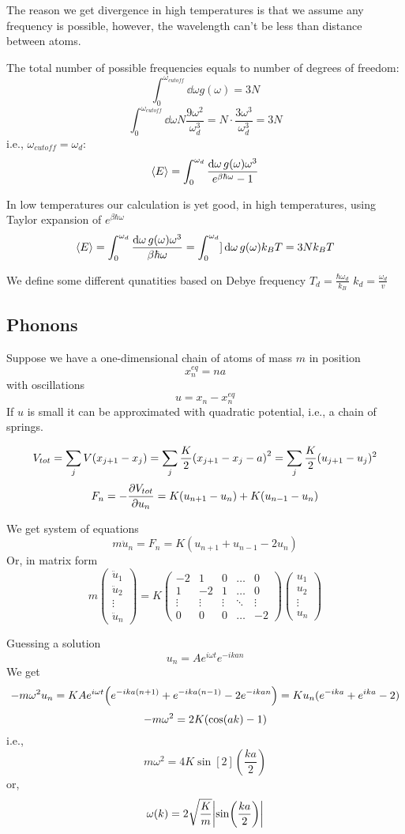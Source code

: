 The reason we get divergence in high temperatures is that we assume any frequency is possible, however, the wavelength can't be less than distance between atoms.

The total number of possible frequencies equals to number of degrees of freedom:
$$\int_0^{\omega_{cutoff}} \dd{\omega} g(\omega) = 3N$$
$$\int_0^{\omega_{cutoff}} \dd{\omega}N \frac{9\omega^2}{\omega_d^3} = N\cdot \frac{3\omega^3}{\omega_d^3}=3N$$
i.e., $\omega_{cutoff} = \omega_d$:
$$\expval{E} = \int_0^{\omega_d} \frac{\dd{\omega} g(\omega) \omega^3}{e^{\beta \hbar \omega}-1}$$

In low temperatures our calculation is yet good, in high temperatures, using Taylor expansion of $e^{\beta \hbar \omega}$
$$\expval{E} = \int_0^{\omega_d} \frac{\dd{\omega} g(\omega) \omega^3}{\beta \hbar \omega} = \int_0^{\omega_d} ]\dd{\omega} g(\omega) k_B T = 3Nk_B T$$

We define some different qunatities based on Debye frequency
$T_d = \frac{\hbar \omega_d}{k_B}$
$k_d = \frac{ \omega_d}{v}$

\subsection{Phonons}
Suppose we have a one-dimensional chain of atoms of mass $m$ in position
$$x_n^{eq} = na$$
with  oscillations
$$u =x_n - x_n^{eq}$$
If $u$ is small it can be approximated with quadratic potential, i.e., a chain of springs.

$$V_{tot} = \sum_j V(x_{j+1}-x_j) = \sum_j \frac{K}{2} \qty(x_{j+1} -x_j -a)^2 = \sum_j \frac{K}{2} (u_{j+1}-u_j)^2 $$
$$F_n = -\pdv{V_{tot}}{u_n} = K(u_{n+1}-u_n) + K(u_{n-1}-u_n)$$

We get system of equations
$$m\ddot{u}_n = F_n = K(u_{n+1} + u_{n-1} - 2u_n)$$
Or, in matrix form
$$m\begin{pmatrix}
\ddot{u}_1\\\ddot{u}_2\\\vdots \\\ddot{u}_n
\end{pmatrix} = K\begin{pmatrix}
-2&1&0&\dots&0\\
1&-2&1&\dots& 0\\
\vdots&\vdots&\vdots&\ddots&\vdots\\
0&0&0&\dots &-2
\end{pmatrix}\begin{pmatrix}
u_1\\u_2\\\vdots \\u_n
\end{pmatrix} $$

Guessing a solution
$$u_n = A e^{i\omega t} e^{-ikan}$$
We get
$$-m\omega^2u_n = K A  e^{i\omega t}\qty( e^{-ika(n+1)}+e^{-ika(n-1)} - 2e^{-ikan} ) = Ku_n(e^{-ika} + e^{ika} -2)$$
$$-m\omega^2 = 2K\qty(\cos(ak)-1)$$
i.e.,
$$m\omega^2 = 4K \sin[2](\frac{ka}{2})$$
or,
$$\omega(k) = 2\sqrt{\frac{K}{m}} \abs{\sin(\frac{ka}{2})}$$